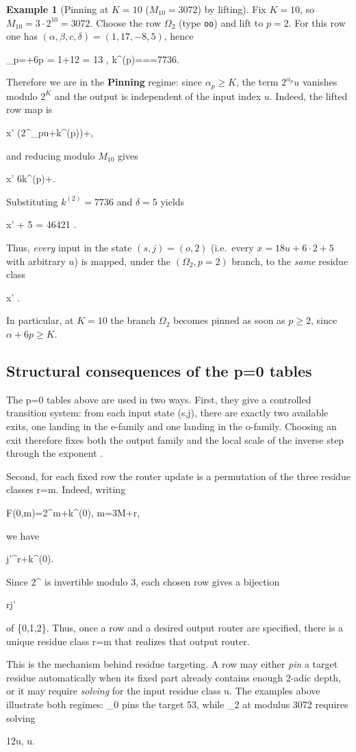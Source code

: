 \documentclass[11pt,letterpaper]{amsart}
\def\({}%
\def\){}%
\def\[{ }%
\def\]{ }%
\theoremstyle{definition}
\newtheorem{example}{Example}
\theoremstyle{plain}
\theoremstyle{plain}
\theoremstyle{remark}
\begin{document}
\begin{example}[Pinning at $K=10$ ($M_{10}=3072$) by lifting]
Fix $K=10$, so $M_{10}=3\cdot 2^{10}=3072$.  Choose the row $\Omega_2$ (type \texttt{oo}) and lift to $p=2$.
For this row one has $(\alpha,\beta,c,\delta)=(1,17,-8,5)$, hence
\[
\alpha_p=\alpha+6p = 1+12 = 13 ,
\qquad
k^{(p)}===7736.
\]
Therefore we are in the \textbf{Pinning} regime: since $\alpha_p\ge K$, the term $2^{\alpha_p}u$ vanishes modulo $2^K$ and the output is independent of the input index $u$.
Indeed, the lifted row map is
\[
x' \bigl(2^{\alpha_p}u+k^{(p)}\bigr)+\delta {},
\]
and reducing modulo $M_{10}$ gives
\[
x' \equiv 6k^{(p)}+\delta {}.
\]
Substituting $k^{(2)}=7736$ and $\delta=5$ yields
\[
x'  + 5 = 46421  .
\]
Thus, \emph{every} input in the state $(s,j)=(o,2)$ (i.e.\ every $x=18u+6\cdot 2+5$ with arbitrary $u$) is mapped, under the $(\Omega_2,p=2)$ branch, to the \emph{same} residue class
\[
x'  .
\]
In particular, at $K=10$ the branch $\Omega_2$ becomes pinned as soon as $p\ge 2$, since $\alpha+6p\ge K$.
\end{example}


\subsection{Structural consequences of the \(p=0\) tables}

The \(p=0\) tables above are used in two ways.  First, they give a
controlled transition system: from each input state \((s,j)\), there are
exactly two available exits, one landing in the \(e\)-family and one
landing in the \(o\)-family.  Choosing an exit therefore fixes both the
output family and the local scale of the inverse step through the exponent
\(\alpha\).

Second, for each fixed row the router update is a permutation of the
three residue classes \(r=m\).  Indeed, writing
\[
F(0,m)=2^\alpha m+k^{(0)},
\qquad
m=3M+r,
\]
we have
\[
j'^\alpha r+k^{(0)}.
\]
Since \(2^\alpha\) is invertible modulo \(3\), each chosen row gives a
bijection
\[
r\longmapsto j'
\]
of \(\{0,1,2\}\).  Thus, once a row and a desired output router are
specified, there is a unique residue class \(r=m\) that realizes
that output router.

This is the mechanism behind residue targeting.  A row may either
\emph{pin} a target residue automatically when its fixed part already
contains enough \(2\)-adic depth, or it may require \emph{solving} for the
input residue class \(u\).  The examples above illustrate both regimes:
\(\Omega_0\) pins the target \(53\), while \(\Omega_2\) at
modulus \(3072\) requires solving
\[
12u,
\qquad
u.
\]
\end{document}
